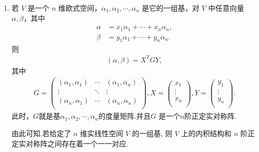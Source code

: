 \documentclass[../../main.tex]{subfiles}%
\begin{document}
\begin{theorem}\label{theorem:度量矩阵的性质}
\begin{enumerate}
\item 若 \(V\) 是一个 \(n\) 维欧式空间，\(\alpha_1,\alpha_2,\cdots,\alpha_n\) 是它的一组基，对 \(V\) 中任意向量 \(\alpha,\beta\)，其中
\begin{align*}
\alpha&=x_1\alpha_1+\cdots + x_n\alpha_n,\\
\beta&=y_1\alpha_1+\cdots + y_n\alpha_n.
\end{align*}
则
\begin{align}
(\alpha,\beta)=X^TGY,\label{equation:---9.2.1}
\end{align}
其中
\begin{align*}
G=\left( \begin{matrix}
\left( \alpha _1,\alpha _1 \right)&		\cdots&		\left( \alpha _1,\alpha _n \right)\\
\vdots&		\ddots&		\vdots\\
\left( \alpha _n,\alpha _1 \right)&		\cdots&		\left( \alpha _n,\alpha _n \right)\\
\end{matrix} \right) ,X=\left( \begin{array}{c}
x_1\\
\vdots\\
x_n\\
\end{array} \right) ,Y=\left( \begin{array}{c}
y_1\\
\vdots\\
y_n\\
\end{array} \right) .
\end{align*}
此时，$G$就是基\(\alpha_1,\alpha_2,\cdots,\alpha_n\)的度量矩阵.并且$G$ 是一个$n$阶正定实对称阵.

由此可知,若给定了 $n$ 维实线性空间 $V$ 的一组基, 则 $V$ 上的内积结构和 $n$ 阶正定实对称阵之间存在着一个一一对应. 


\end{enumerate}
\end{theorem}
\end{document}
